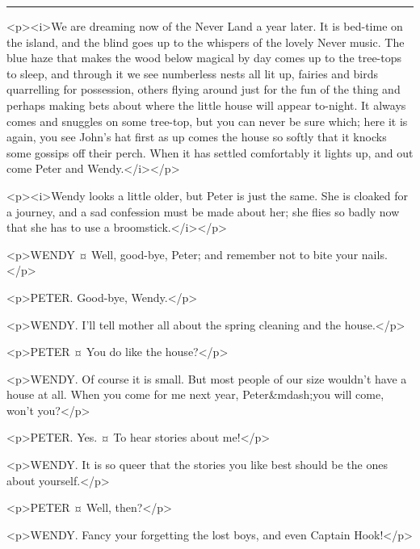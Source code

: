 
\plainbreak{1}

<p><i>We are dreaming now of the Never Land a year later. It is bed-time on the island, and the blind goes up to the whispers of the lovely Never music. The blue haze that makes the wood below magical by day comes up to the tree-tops to sleep, and through it we see numberless nests all lit up, fairies and birds quarrelling for possession, others flying around just for the fun of the thing and perhaps making bets about where the little house will appear to-night. It always comes and snuggles on some tree-top, but you can never be sure which; here it is again, you see John's hat first as up comes the house so softly that it knocks some gossips off their perch. When it has settled comfortably it lights up, and out come Peter and Wendy.</i></p>

<p><i>Wendy looks a little older, but Peter is just the same. She is cloaked for a journey, and a sad confession must be made about her; she flies so badly now that she has to use a broomstick.</i></p>

<p>WENDY ¤
Well, good-bye, Peter; and remember not to bite your nails.</p>

<p>PETER. Good-bye, Wendy.</p>

<p>WENDY. I'll tell mother all about the spring cleaning and the house.</p>

<p>PETER ¤
You do like the house?</p>

<p>WENDY. Of course it is small. But most people of our size wouldn't have a house at all.
When you come for me next year, Peter&mdash;you will come, won't you?</p>

<p>PETER. Yes.
¤
To hear stories about me!</p>

<p>WENDY. It is so queer that the stories you like best should be the ones about yourself.</p>

<p>PETER ¤
Well, then?</p>

<p>WENDY. Fancy your forgetting the lost boys, and even Captain Hook!</p>


